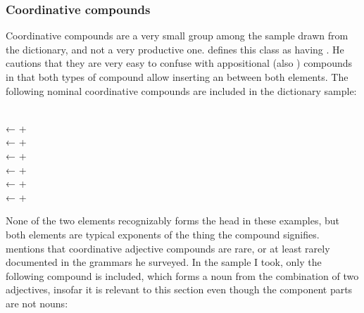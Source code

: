
\subsubsection{Coordinative compounds}

Coordinative compounds are a very small group among the sample drawn from the
dictionary, and not a very productive one. \citet{bauer2001} defines this class
as having . He cautions that they are very easy to
confuse with appositional (also ) compounds in that both types
of compound allow inserting an  between both elements. The following
nominal coordinative compounds are included in the dictionary sample:

\pex
	\a {} \\
		← 
		+ 
	\a {} \\
		← 
		+ 
	\a {} \\
		← 
		+ 
	\a {} \\
		← 
		+ 
	\a {} \\
		← 
		+ 
	\a {} \\
		← 
		+ 
\xe

None of the two elements recognizably forms the head in these examples, but
both elements are typical exponents of the thing the compound signifies.
\citet[699]{bauer2001} mentions that coordinative adjective compounds are rare,
or at least rarely documented in the grammars he surveyed. In the sample I
took, only the following compound is included, which forms a noun from the
combination of two adjectives, insofar it is relevant to this section even
though the component parts are not nouns:

